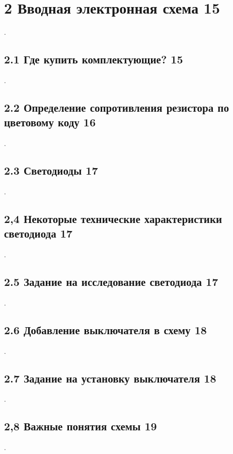 
\chapter{2 Вводная электронная схема 15}

.

\section{2.1 Где купить комплектующие? 15}

.

\section{2.2 Определение сопротивления резистора по цветовому коду 16}

.

\section{2.3 Светодиоды 17}

.

\section{2,4 Некоторые технические характеристики светодиода 17}

.

\section{2.5 Задание на исследование светодиода 17}

.

\section{2.6 Добавление выключателя  в схему 18}

.

\section{2.7 Задание на установку выключателя 18}

.

\section{2,8 Важные понятия схемы 19}

.

